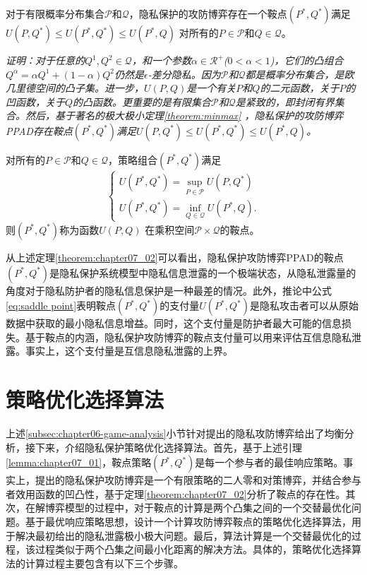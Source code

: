 \begin{theorem}\label{theorem:chapter07_02}
对于有限概率分布集合$\mathcal{P}$和$\mathcal{Q}$，隐私保护的攻防博弈存在一个鞍点$(P^*,Q^*)$满足$U(P,Q^*)\leq U(P^*,Q^*)\leq U(P^*,Q)$ 对所有的$P\in \mathcal{P}$和$Q \in \mathcal{Q}$。
\end{theorem}
{\em 证明：对于任意的$Q^1,Q^2 \in \mathcal{Q}$，和一个参数$\alpha \in \mathcal{R}^+$($0 <\alpha < 1$)，它们的凸组合$Q^{\alpha}=\alpha Q^1+(1-\alpha)Q^2$仍然是$\epsilon$-差分隐私。因为$\mathcal{P}$和$\mathcal{Q}$都是概率分布集合，是欧几里德空间的凸子集。进一步，$U(P,Q)$是一个有关$P$和$Q$的二元函数，关于$P$的凹函数，关于$Q$的凸函数。更重要的是有限集合$\mathcal{P}$和$\mathcal{Q}$是紧致的，即封闭有界集合。然后，基于著名的极大极小定理\textup{\ref{theorem:minmax}}
，隐私保护的攻防博弈PPAD存在鞍点$(P^*,Q^*)$满足$U(P,Q^*)\leq U(P^*,Q^*)\leq U(P^*,Q)$。
}
\begin{corollary}对所有的$P\in \mathcal{P}$和$Q \in \mathcal{Q}$，策略组合$(P^*,Q^*)$满足
\begin{equation}\label{eq:saddle point}
	\begin{cases}
		U(P^*,Q^*) = \sup_{P\in\mathcal{P}}U(P,Q^*)\\
		U(P^*,Q^*) = \inf_{Q\in\mathcal{Q}}U(P^*,Q).
	\end{cases}
\end{equation}
则$(P^*,Q^*)$称为函数$U(P,Q)$ 在乘积空间$\mathcal{P}\times\mathcal{Q}$的鞍点。
\end{corollary}
从上述定理\ref{theorem:chapter07_02}可以看出，隐私保护攻防博弈PPAD的鞍点$(P^*,Q^*)$是隐私保护系统模型中隐私信息泄露的一个极端状态，从隐私泄露量的角度对于隐私防护者的隐私信息保护是一种最差的情况。此外，推论中公式\ref{eq:saddle point}表明鞍点$(P^*,Q^*)$的支付量$U(P^*,Q^*)$是隐私攻击者可以从原始数据中获取的最小隐私信息增益。同时，这个支付量是防护者最大可能的信息损失。基于鞍点的内涵，隐私保护攻防博弈的鞍点支付量可以用来评估互信息隐私泄露。事实上，这个支付量是互信息隐私泄露的上界。

\section{策略优化选择算法}\label{sec:chapter06-algorithm}
上述\ref{subsec:chapter06-game-analysis}小节针对提出的隐私攻防博弈给出了均衡分析，接下来，介绍隐私保护策略优化选择算法。首先，基于上述引理\ref{lemma:chapter07_01}，鞍点策略$(P^*,Q^*)$是每一个参与者的最佳响应策略。事实上，提出的隐私保护攻防博弈是一个有限策略的二人零和对策博弈，并结合参与者效用函数的凹凸性，基于定理\ref{theorem:chapter07_02}分析了鞍点的存在性。其次，在解博弈模型的过程中，对于鞍点的计算是两个凸集之间的一个交替最优化问题。基于最优响应策略思想，设计一个计算攻防博弈鞍点的策略优化选择算法，用于解决最初给出的隐私泄露极小极大问题。最后，算法计算是一个交替最优化的过程，该过程类似于两个凸集之间最小化距离的解决方法。具体的，策略优化选择算法的计算过程主要包含有以下三个步骤。

